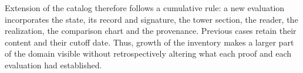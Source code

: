 Extension of the catalog therefore follows a cumulative rule:
a new evaluation incorporates the state, its record and signature, the tower
section, the reader, the realization, the comparison chart and the
provenance. Previous cases retain their content and their cutoff
date. Thus, growth of the inventory makes a larger part
of the domain visible without retrospectively altering what each proof and
each evaluation had established.
